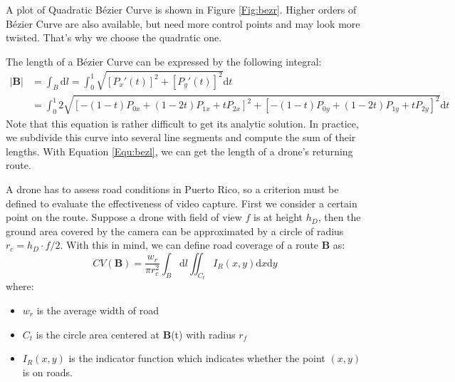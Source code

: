 \documentclass{mcmthesis}
\begin{document}
A plot of Quadratic B\'{e}zier Curve is shown in Figure \ref{Fig:bezr}. Higher orders of B\'{e}zier Curve are also available, but need more control points and may look more twisted. That's why we choose the quadratic one. 

The length of a B\'{e}zier Curve can be expressed by the following integral:
\begin{equation}
\begin{aligned}
    |\mathbf{B}| &= \int_B \mathrm{d}l = \int_0^1 \sqrt{[P_x'(t)]^2 + [P_y'(t)]^2} \mathrm{d}t \\
    &= \int_0^1 2\sqrt{[-(1-t)P_{0x}+(1-2t)P_{1x}+tP_{2x}]^2 + [-(1-t)P_{0y}+(1-2t)P_{1y}+tP_{2y}]^2} \mathrm{d}t
\end{aligned}
\label{Equ:bezl}
\end{equation}
Note that this equation is rather difficult to get its analytic solution. In practice, we subdivide this curve into several line segments and compute the sum of their lengths. With Equation \eqref{Equ:bezl}, we can get the length of a drone's returning route.

A drone has to assess road conditions in Puerto Rico, so a criterion must be defined to evaluate the effectiveness of video capture. First we consider a certain point on the route. Suppose a drone with field of view \cite{FieldOfView} $f$ is at height $h_D$, then the ground area covered by the camera can be approximated by a circle of radius $r_c = h_D \cdot f/2$. With this in mind, we can define road coverage of a route $\mathbf{B}$ as:
\begin{equation}
    CV(\mathbf{B}) = \frac{w_r}{\pi r_c^2} \int_B\mathrm{d}l \iint_{C_t} I_R(x, y) \mathrm{d}x\mathrm{d}y
    \label{Equ:rtcv}
\end{equation}
where:
\begin{itemize}
    \item $w_r$ is the average width of road
    \item $C_t$ is the circle area centered at $\mathbf{B}$(t) with radius $r_f$
    \item $I_{R}(x, y)$ is the indicator function which indicates whether the point $(x, y)$ is on roads.
\end{itemize}
\end{document}
